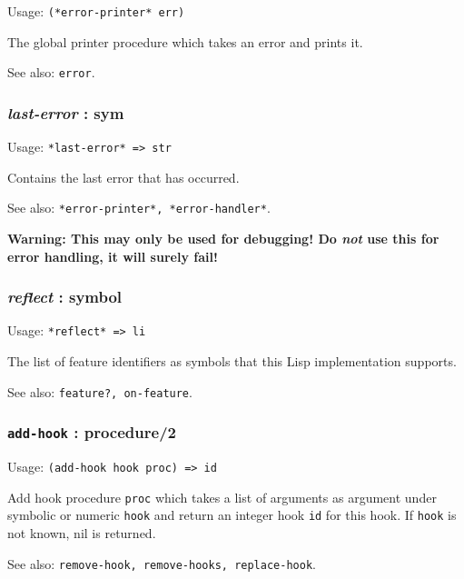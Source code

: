 \documentclass[
]{article}
\newcommand{\passthrough}[1]{#1}
\begin{document}
Usage: \passthrough{\lstinline!(*error-printer* err)!}

The global printer procedure which takes an error and prints it.

See also: \passthrough{\lstinline!error!}.

\hypertarget{last-error-sym}{%
\subsubsection{\texorpdfstring{\emph{last-error} :
sym}{last-error : sym}}\label{last-error-sym}}

Usage: \passthrough{\lstinline!*last-error* => str!}

Contains the last error that has occurred.

See also: \passthrough{\lstinline!*error-printer*, *error-handler*!}.

\textbf{Warning: This may only be used for debugging! Do \emph{not} use
this for error handling, it will surely fail!}

\hypertarget{reflect-symbol}{%
\subsubsection{\texorpdfstring{\emph{reflect} :
symbol}{reflect : symbol}}\label{reflect-symbol}}

Usage: \passthrough{\lstinline!*reflect* => li!}

The list of feature identifiers as symbols that this Lisp implementation
supports.

See also: \passthrough{\lstinline!feature?, on-feature!}.

\hypertarget{add-hook-procedure2}{%
\subsubsection{\texorpdfstring{\texttt{add-hook} :
procedure/2}{add-hook : procedure/2}}\label{add-hook-procedure2}}

Usage: \passthrough{\lstinline!(add-hook hook proc) => id!}

Add hook procedure \passthrough{\lstinline!proc!} which takes a list of
arguments as argument under symbolic or numeric
\passthrough{\lstinline!hook!} and return an integer hook
\passthrough{\lstinline!id!} for this hook. If
\passthrough{\lstinline!hook!} is not known, nil is returned.

See also:
\passthrough{\lstinline!remove-hook, remove-hooks, replace-hook!}.
\end{document}

